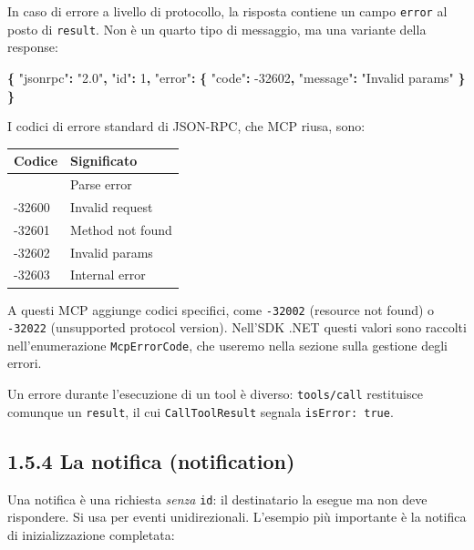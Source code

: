 \documentclass[
  italian,
  10pt,
]{book}
\newenvironment{Shaded}{\begin{snugshade}}{\end{snugshade}}
\newcommand{\DataTypeTok}[1]{\textcolor[rgb]{0.13,0.29,0.53}{#1}}
\newcommand{\DecValTok}[1]{\textcolor[rgb]{0.00,0.00,0.81}{#1}}
\newcommand{\FunctionTok}[1]{\textcolor[rgb]{0.13,0.29,0.53}{\textbf{#1}}}
\newcommand{\StringTok}[1]{\textcolor[rgb]{0.31,0.60,0.02}{#1}}
\newcounter{none} %
\begin{document}
In caso di errore a livello di protocollo, la risposta contiene un campo
\texttt{error} al posto di \texttt{result}. Non è un quarto tipo di
messaggio, ma una variante della response:

\begin{Shaded}
\begin{Highlighting}[]
\FunctionTok{\{}
  \DataTypeTok{"jsonrpc"}\FunctionTok{:} \StringTok{"2.0"}\FunctionTok{,}
  \DataTypeTok{"id"}\FunctionTok{:} \DecValTok{1}\FunctionTok{,}
  \DataTypeTok{"error"}\FunctionTok{:} \FunctionTok{\{}
    \DataTypeTok{"code"}\FunctionTok{:} \DecValTok{{-}32602}\FunctionTok{,}
    \DataTypeTok{"message"}\FunctionTok{:} \StringTok{"Invalid params"}
  \FunctionTok{\}}
\FunctionTok{\}}
\end{Highlighting}
\end{Shaded}

I codici di errore standard di JSON-RPC, che MCP riusa, sono:

{\def\LTcaptype{none} %
\begin{longtable}[]{@{}ll@{}}
\toprule\noalign{}
Codice & Significato \\
\midrule\noalign{}
\endhead
\bottomrule\noalign{}
\endlastfoot
-32700 & Parse error \\
-32600 & Invalid request \\
-32601 & Method not found \\
-32602 & Invalid params \\
-32603 & Internal error \\
\end{longtable}
}

A questi MCP aggiunge codici specifici, come \texttt{-32002} (resource
not found) o \texttt{-32022} (unsupported protocol version). Nell'SDK
.NET questi valori sono raccolti nell'enumerazione
\texttt{McpErrorCode}, che useremo nella sezione sulla gestione degli
errori.

Un errore durante l'esecuzione di un tool è diverso: \texttt{tools/call}
restituisce comunque un \texttt{result}, il cui \texttt{CallToolResult}
segnala \texttt{isError:\ true}.

\subsection{1.5.4 La notifica
(notification)}\label{la-notifica-notification}

Una notifica è una richiesta \emph{senza} \texttt{id}: il destinatario
la esegue ma non deve rispondere. Si usa per eventi unidirezionali.
L'esempio più importante è la notifica di inizializzazione completata:
\end{document}
